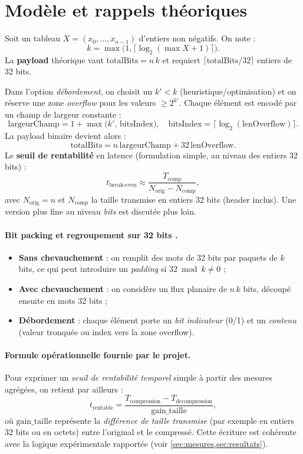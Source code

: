 \section{Modèle et rappels théoriques}
\label{sec:modele}

Soit un tableau $X = (x_0,\dots,x_{n-1})$ d'entiers non négatifs. On note :
\[
 k = \max\bigl(1, \lceil \log_2(\max X + 1) \rceil\bigr).
\]
La \textbf{payload} théorique vaut $\text{totalBits} = n\,k$ et requiert $\lceil \text{totalBits}/32 \rceil$ entiers de 32 bits.

Dans l'option \textit{débordement}, on choisit un $k' < k$ (heuristique/optimisation) et on réserve une zone \textit{overflow} pour les valeurs $\ge 2^{k'}$. Chaque élément est encodé par un champ de largeur constante :
\[
 \text{largeurChamp} = 1 + \max\bigl(k',\, \text{bitsIndex}\bigr),\quad \text{bitsIndex}=\lceil\log_2(\text{lenOverflow})\rceil.
\]
La payload binaire devient alors :
\[
 \text{totalBits} = n\,\text{largeurChamp} + 32\,\text{lenOverflow}.
\]
Le \textbf{seuil de rentabilité} en latence (formulation simple, au niveau des entiers 32 bits) :
\[
 t_{\text{break-even}} \approx \frac{T_{\text{comp}}}{N_{\text{orig}} - N_{\text{comp}}},
\]
avec $N_{\text{orig}}=n$ et $N_{\text{comp}}$ la taille transmise en entiers 32 bits (header inclus). Une version plus fine au niveau \emph{bits} est discutée plus loin.

\paragraph{Bit packing et regroupement sur 32 bits \cite{bitpacking}.}
\begin{itemize}
	\item \textbf{Sans chevauchement} : on remplit des mots de 32 bits par paquets de $k$ bits, ce qui peut introduire un \emph{padding} si $32\bmod k\neq 0$ ;
	\item \textbf{Avec chevauchement} : on considère un flux planaire de $n\,k$ bits, découpé ensuite en mots 32 bits ;
	\item \textbf{Débordement} : chaque élément porte un \emph{bit indicateur} (0/1) et un \emph{contenu} (valeur tronquée ou index vers la zone overflow).
\end{itemize}

\paragraph{Formule opérationnelle fournie par le projet.} Pour exprimer un \emph{seuil de rentabilité temporel} simple à partir des mesures agrégées, on retient par ailleurs :
\[
 t_{\text{rentable}} = \frac{T_{\text{compression}} - T_{\text{decompression}}}{\text{gain\_taille}},
\]
où $\text{gain\_taille}$ représente la \emph{différence de taille transmise} (par exemple en entiers 32 bits ou en octets) entre l'original et le compressé. Cette écriture est cohérente avec la logique expérimentale rapportée (voir \cref{sec:mesures,sec:resultats}).
